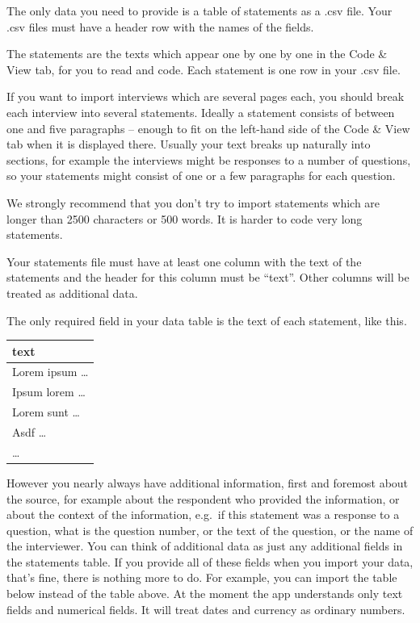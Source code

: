 \documentclass[
]{book}
\begin{document}
The only data you need to provide is a table of statements as a .csv file. Your .csv files must have a header row with the names of the fields.

The statements are the texts which appear one by one by one in the Code \& View tab, for you to read and code. Each statement is one row in your .csv file.

If you want to import interviews which are several pages each, you should break each interview into several statements. Ideally a statement consists of between one and five paragraphs -- enough to fit on the left-hand side of the Code \& View tab when it is displayed there. Usually your text breaks up naturally into sections, for example the interviews might be responses to a number of questions, so your statements might consist of one or a few paragraphs for each question.

We strongly recommend that you don't try to import statements which are longer than 2500 characters or 500 words. It is harder to code very long statements.

Your statements file must have at least one column with the text of the statements and the header for this column must be ``text''. Other columns will be treated as additional data.

The only required field in your data table is the text of each statement, like this.

\begin{longtable}[]{@{}l@{}}
\toprule
\textbf{text}\tabularnewline
\midrule
\endhead
Lorem ipsum \ldots{}\tabularnewline
Ipsum lorem \ldots{}\tabularnewline
Lorem sunt \ldots{}\tabularnewline
Asdf \ldots{}\tabularnewline
\ldots{}\tabularnewline
\bottomrule
\end{longtable}

However you nearly always have additional information, first and foremost about the source, for example about the respondent who provided the information, or about the context of the information, e.g.~if this statement was a response to a question, what is the question number, or the text of the question, or the name of the interviewer. You can think of additional data as just any additional fields in the statements table. If you provide all of these fields when you import your data, that's fine, there is nothing more to do. For example, you can import the table below instead of the table above. At the moment the app understands only text fields and numerical fields. It will treat dates and currency as ordinary numbers.
\end{document}
